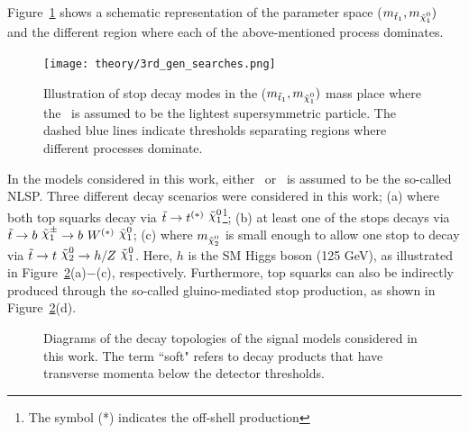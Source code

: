				Figure~\ref{fig:stop_topologies} shows a schematic representation of the parameter space ($m_{\stopone}, m_{\ninoone})$ and the different region where each of the above-mentioned process dominates. %

				\begin{figure}[!htb]
					\centering
					\texttt{[image: theory/3rd\_gen\_searches.png]}
					\caption{\label{fig:stop_topologies} Illustration of stop decay modes in the ($m_{\stopone}, m_{\ninoone})$ mass place where the \ninoone\ is assumed to be the lightest supersymmetric particle. The dashed blue lines indicate thresholds separating regions where different processes dominate.}
				\end{figure}

				In the models considered in this work, either \ninotwo\ or \chinoonepm\ is assumed to be the so-called \ac{NLSP}. Three different decay scenarios were considered in this work; (a) where both top squarks decay via $\stop\rightarrow t^{(*)}\ \ninoone$\footnote{The symbol (*) indicates the off-shell production}; (b) at least one of the stops decays via $\stop\rightarrow b\ \chinoonepm \rightarrow b\ \Wboson^{(*)}\ \ninoone$; (c) where $m_{\ninotwo}$ is small enough to allow one stop to decay via $\stop\to t\ \ninotwo \to h/Z\ \ninoone$. Here, $h$ is the \ac{SM} Higgs boson (125 GeV), as illustrated in Figure~\ref{fig:feynDiagModels}(a)$-$(c), respectively. Furthermore, top squarks can also be indirectly produced through the so-called gluino-mediated stop production, as shown in Figure~\ref{fig:feynDiagModels}(d).

				\begin{figure}[!htb]
					\begin{center}
						\hspace{0.05\textwidth}
						\hspace{0.05\textwidth}
						\hspace{0.05\textwidth}
						\hspace{0.05\textwidth}
					\end{center}
					\caption{Diagrams of the decay topologies of the signal models considered in this work. The term ``soft" refers to decay products that have transverse momenta below the detector thresholds.}
					\label{fig:feynDiagModels}
				\end{figure}

